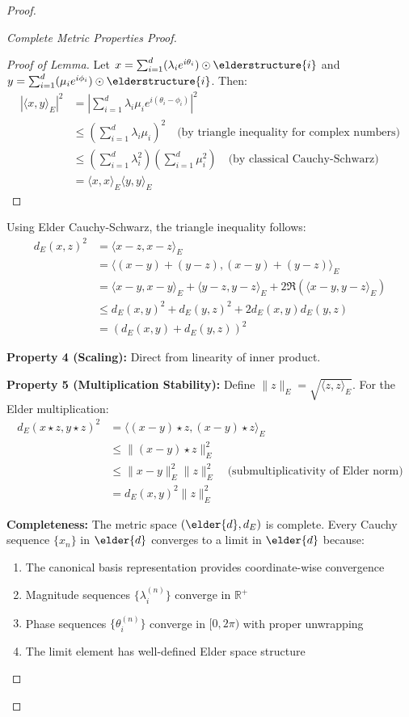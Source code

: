 \begin{proof}
\begin{proof}[Complete Metric Properties Proof]
\begin{proof}[Proof of Lemma]
Let $x = \sum_{i=1}^{d} (\lambda_i e^{i\theta_i}) \odot \elderstructure{i}$ and $y = \sum_{i=1}^{d} (\mu_i e^{i\phi_i}) \odot \elderstructure{i}$. Then:
\begin{align}
|\langle x, y \rangle_E|^2 &= \left|\sum_{i=1}^d \lambda_i \mu_i e^{i(\theta_i - \phi_i)}\right|^2\\
&\leq \left(\sum_{i=1}^d \lambda_i \mu_i\right)^2 \quad \text{(by triangle inequality for complex numbers)}\\
&\leq \left(\sum_{i=1}^d \lambda_i^2\right)\left(\sum_{i=1}^d \mu_i^2\right) \quad \text{(by classical Cauchy-Schwarz)}\\
&= \langle x, x \rangle_E \langle y, y \rangle_E
\end{align}
\end{proof}

Using Elder Cauchy-Schwarz, the triangle inequality follows:
\begin{align}
d_E(x, z)^2 &= \langle x - z, x - z \rangle_E\\
&= \langle (x - y) + (y - z), (x - y) + (y - z) \rangle_E\\
&= \langle x - y, x - y \rangle_E + \langle y - z, y - z \rangle_E + 2\Re(\langle x - y, y - z \rangle_E)\\
&\leq d_E(x, y)^2 + d_E(y, z)^2 + 2d_E(x, y)d_E(y, z)\\
&= (d_E(x, y) + d_E(y, z))^2
\end{align}

\textbf{Property 4 (Scaling):} Direct from linearity of inner product.

\textbf{Property 5 (Multiplication Stability):} 
Define $\|z\|_E = \sqrt{\langle z, z \rangle_E}$. For the Elder multiplication:
\begin{align}
d_E(x \star z, y \star z)^2 &= \langle (x - y) \star z, (x - y) \star z \rangle_E\\
&\leq \|(x - y) \star z\|_E^2\\
&\leq \|x - y\|_E^2 \|z\|_E^2 \quad \text{(submultiplicativity of Elder norm)}\\
&= d_E(x, y)^2 \|z\|_E^2
\end{align}

\textbf{Completeness:} The metric space $(\elder{d}, d_E)$ is complete. Every Cauchy sequence $\{x_n\}$ in $\elder{d}$ converges to a limit in $\elder{d}$ because:
\begin{enumerate}
    \item The canonical basis representation provides coordinate-wise convergence
    \item Magnitude sequences $\{\lambda_i^{(n)}\}$ converge in $\mathbb{R}^+$
    \item Phase sequences $\{\theta_i^{(n)}\}$ converge in $[0, 2\pi)$ with proper unwrapping
    \item The limit element has well-defined Elder space structure
\end{enumerate}
\end{proof}


\end{proof}

